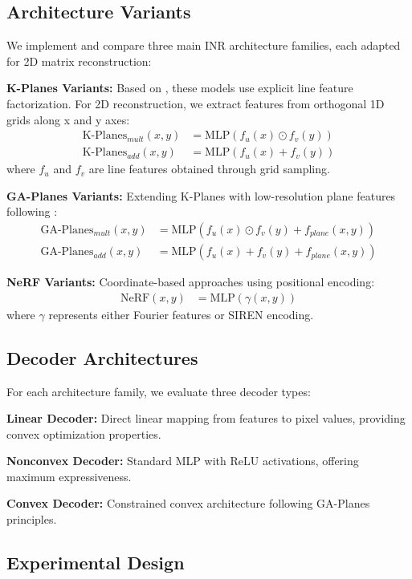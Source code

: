 \documentclass{article}
\begin{document}
\subsection{Architecture Variants}

We implement and compare three main INR architecture families, each adapted for 2D matrix reconstruction:

\textbf{K-Planes Variants:} Based on \citet{fridovich2023kplanes}, these models use explicit line feature factorization. For 2D reconstruction, we extract features from orthogonal 1D grids along x and y axes:
\begin{align}
\text{K-Planes}_{mult}(x,y) &= \text{MLP}(f_u(x) \odot f_v(y)) \\
\text{K-Planes}_{add}(x,y) &= \text{MLP}(f_u(x) + f_v(y))
\end{align}
where $f_u$ and $f_v$ are line features obtained through grid sampling.

\textbf{GA-Planes Variants:} Extending K-Planes with low-resolution plane features following \citet{sivgin2024gaplanes}:
\begin{align}
\text{GA-Planes}_{mult}(x,y) &= \text{MLP}(f_u(x) \odot f_v(y) + f_{plane}(x,y)) \\
\text{GA-Planes}_{add}(x,y) &= \text{MLP}(f_u(x) + f_v(y) + f_{plane}(x,y))
\end{align}

\textbf{NeRF Variants:} Coordinate-based approaches using positional encoding:
\begin{align}
\text{NeRF}(x,y) &= \text{MLP}(\gamma(x,y))
\end{align}
where $\gamma$ represents either Fourier features or SIREN encoding.

\subsection{Decoder Architectures}

For each architecture family, we evaluate three decoder types:

\textbf{Linear Decoder:} Direct linear mapping from features to pixel values, providing convex optimization properties.

\textbf{Nonconvex Decoder:} Standard MLP with ReLU activations, offering maximum expressiveness.

\textbf{Convex Decoder:} Constrained convex architecture following GA-Planes principles.

\subsection{Experimental Design}
\end{document}
